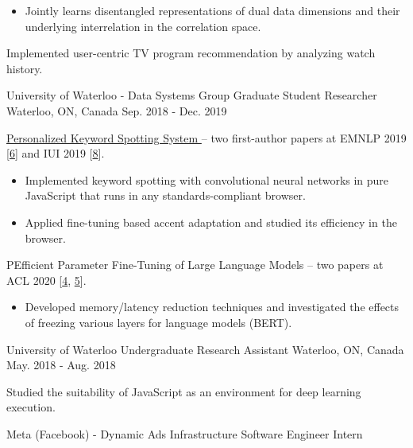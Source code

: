 \begin{cventries}
{\begin{cvitems}
\begin{itemize}[label=$\cdot$,leftmargin=0.7em]
\item {Jointly learns disentangled representations of dual data dimensions and their underlying interrelation in the correlation space.}
\end{itemize}
\item {Implemented user-centric TV program recommendation by analyzing watch history.}
\end{cvitems}
}
\cventry
{University of Waterloo - Data Systems Group} %
{Graduate Student Researcher} %
{Waterloo, ON, Canada} %
{Sep. 2018 - Dec. 2019} %
{ %
\begin{cvitems}
\item {\href{https://github.com/castorini/honkling}{Personalized Keyword Spotting System {\small \faGithub}} -- two first-author papers at EMNLP 2019 [\hyperlink{honkling:EMNLP}{6}] and IUI 2019 [\hyperlink{honkling:IUI}{8}].}
\begin{itemize}[label=$\cdot$,leftmargin=0.7em]
\item {Implemented keyword spotting with convolutional neural networks in pure JavaScript that runs in any standards-compliant browser.}
\item {Applied fine-tuning based accent adaptation and studied its efficiency in the browser.}
\end{itemize}
\item {PEfficient Parameter Fine-Tuning of Large Language Models -- two papers at ACL 2020 [\hyperlink{show:ACL}{4}, \hyperlink{DeeBERT:ACL}{5}].}
\begin{itemize}[label=$\cdot$,leftmargin=0.7em]
\item {Developed memory/latency reduction techniques and investigated the effects of freezing various layers for language models (BERT).}
\end{itemize}
\end{cvitems}
}
\cventry
{University of Waterloo} %
{Undergraduate Research Assistant} %
{Waterloo, ON, Canada} %
{May. 2018 - Aug. 2018} %
{ %
\begin{cvitems}
\item {Studied the suitability of JavaScript as an environment for deep learning execution.}
\end{cvitems}
}
\cventry
{Meta (Facebook) - Dynamic Ads Infrastructure} %
{Software Engineer Intern} %

\end{cventries}
